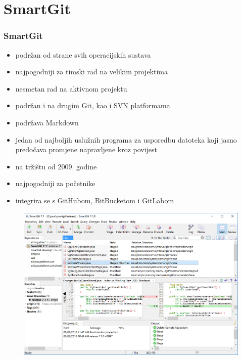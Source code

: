 \section{SmartGit}
\begin{frame}[allowframebreaks]
\frametitle{SmartGit}
 
\begin{itemize}
 \item podržan od strane svih operacijskih sustava
 \item najpogodniji za timski rad na velikim projektima
 \item nesmetan rad na aktivnom projektu
 \item podržan i na drugim Git, kao i SVN platformama
 \item podržava Markdown
 \item jedan od najboljih uslužnih programa za usporedbu datoteka koji jasno predočava promjene napravljene kroz povijest
 \framebreak
 \item na tržištu od 2009. godine
 \item najpogodniji za početnike
 \item integrira se s GitHubom, BitBucketom i GitLabom
\end{itemize}

\begin{figure}[h]
	\centering
	\includegraphics[width=0.9\linewidth]{images/git-project.png}
\end{figure}
\end{frame}
